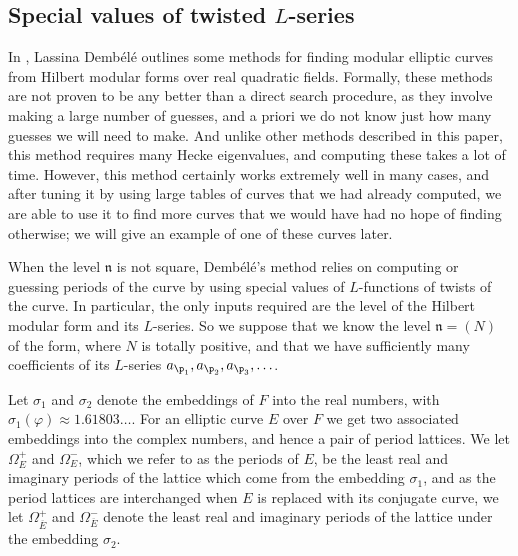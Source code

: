 \documentclass{amsart}
\newcommand{\n}{\mathfrak{n}}
\newcommand{\ap}[1]{a_{\p_{#1}}}
\newcommand{\Ebar}{\overline{E}}
\newcommand{\dembele}{Demb\'el{\'e}\xspace}
\begin{document}
\subsection{Special values of twisted $L$-series}\label{sec:specialvalues}
\newcommand{\Omegap}{\Omega^+}
\newcommand{\Omegam}{\Omega^-}
\newcommand{\Omegapp}{\Omega^{++}}
\newcommand{\Omegapm}{\Omega^{+-}}
\newcommand{\Omegamp}{\Omega^{-+}}
\newcommand{\Omegamm}{\Omega^{--}}
\newcommand{\OmegammEguess}{\Omega^{--}_{E, \mathrm{guess}}}
\newcommand{\OmegampEguess}{\Omega^{-+}_{E, \mathrm{guess}}}
\newcommand{\OmegapmEguess}{\Omega^{+-}_{E, \mathrm{guess}}}
\newcommand{\OmegappEguess}{\Omega^{++}_{E, \mathrm{guess}}}

In \cite{dembele:elliptic-curves-quadratic-fields}, Lassina \dembele
outlines some methods for finding modular elliptic curves from Hilbert
modular forms over real quadratic fields. Formally, these methods are
not proven to be any better than a direct search procedure, as they
involve making a large number of guesses, and a priori we do not know
just how many guesses we will need to make. And unlike other methods
described in this paper, this method requires many Hecke eigenvalues,
and computing these takes a lot of time. However, this method
certainly works extremely well in many cases, and after tuning it by
using large tables of curves that we had already computed, we are able
to use it to find more curves that we would have had no hope of
finding otherwise; we will give an example of one of these curves
later. 

When the level $\n$ is not square, \dembele's method relies on computing
or guessing periods of the curve by using special values of
$L$-functions of twists of the curve. In particular, the only inputs
required are the level of the Hilbert modular form and its $L$-series. So
we suppose that we know the level $\n = (N)$ of the form, where $N$ is
totally positive, and that we have sufficiently many coefficients of its
$L$-series $\ap{1}, \ap{2}, \ap{3}, \ldots$.

Let $\sigma_1$ and $\sigma_2$ denote the embeddings of $F$ into the
real numbers, with $\sigma_1(\varphi) \approx 1.61803\ldots$. For
an elliptic curve $E$ over $F$ we get two associated embeddings into
the complex numbers, and hence a pair of period lattices. We let $\Omegap_E$
and $\Omegam_E$, which we refer to as the periods of $E$,
be the least real and imaginary periods of the lattice
which come from the embedding $\sigma_1$, and as the period lattices are interchanged
when $E$ is replaced with its conjugate curve, we let $\Omegap_{\Ebar}$
and $\Omegam_{\Ebar}$ denote the least real and imaginary periods
of the lattice under the embedding $\sigma_2$.
\end{document}
